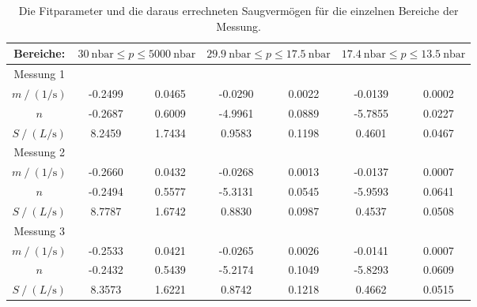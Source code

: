     \begin{table}[h]
      \centering
      \caption{Die Fitparameter und die daraus errechneten Saugvermögen für die einzelnen Bereiche der Messung.}
      \label{tab:fitpara_turbo_alt}
      \begin{tabular}{c S[table-format=2.4] @{${}\pm{}$} S S[table-format=2.4] @{${}\pm{}$} S S[table-format=2.4] @{${}\pm{}$} S}
        \toprule
        {Bereiche:} &  &  & \\
        \midrule
        Messung 1 \\ 
        \cmidrule(lr){1-1}
        $m \mathbin{/} \left(\si{1\per\second}\right)$ & -0.2499 & 0.0465 & -0.0290 & 0.0022 & -0.0139 & 0.0002 \\
        $n$                                            & -0.2687 & 0.6009 & -4.9961 & 0.0889 & -5.7855 & 0.0227 \\
        $S \mathbin{/} \left(\si{L\per\second}\right)$ &  8.2459 & 1.7434 &  0.9583 & 0.1198 &  0.4601 & 0.0467 \\
        \midrule
        Messung 2 \\ 
        \cmidrule(lr){1-1}
        $m \mathbin{/} \left(\si{1\per\second}\right)$ & -0.2660 & 0.0432 & -0.0268 & 0.0013 & -0.0137 & 0.0007 \\
        $n$                                            & -0.2494 & 0.5577 & -5.3131 & 0.0545 & -5.9593 & 0.0641 \\
        $S \mathbin{/} \left(\si{L\per\second}\right)$ &  8.7787 & 1.6742 &  0.8830 & 0.0987 &  0.4537 & 0.0508 \\
        \midrule
        Messung 3 \\ 
        \cmidrule(lr){1-1}
        $m \mathbin{/} \left(\si{1\per\second}\right)$ & -0.2533 & 0.0421 & -0.0265 & 0.0026 & -0.0141 & 0.0007 \\
        $n$                                            & -0.2432 & 0.5439 & -5.2174 & 0.1049 & -5.8293 & 0.0609 \\
        $S \mathbin{/} \left(\si{L\per\second}\right)$ &  8.3573 & 1.6221 &  0.8742 & 0.1218 &  0.4662 & 0.0515 \\      
        \bottomrule
      \end{tabular}
    \end{table}

